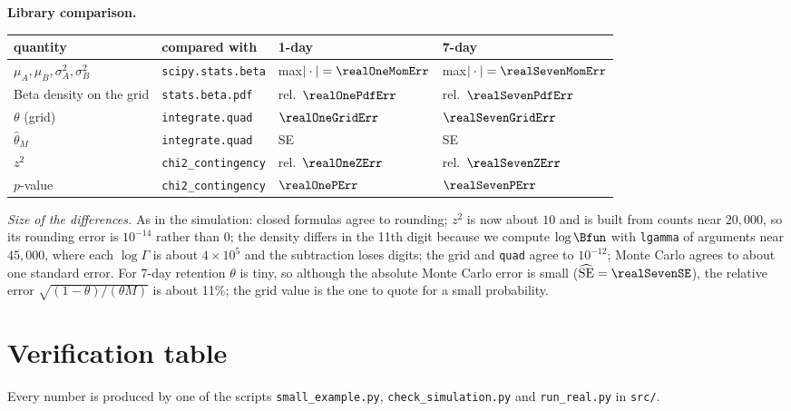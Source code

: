 \textbf{Library comparison.}
\begin{center}\small
\begin{tabular}{llll}\toprule
quantity & compared with & 1-day & 7-day\\ \midrule
$\mu_A,\mu_B,\sigma_A^2,\sigma_B^2$ & \texttt{scipy.stats.beta} & max$|\cdot|=\realOneMomErr$ & max$|\cdot|=\realSevenMomErr$\\
Beta density on the grid & \texttt{stats.beta.pdf} & rel.\ $\realOnePdfErr$ & rel.\ $\realSevenPdfErr$\\
$\theta$ (grid) & \texttt{integrate.quad} & $\realOneGridErr$ & $\realSevenGridErr$\\
$\hat\theta_M$ & \texttt{integrate.quad} & \realOneNSE{} SE & \realSevenNSE{} SE\\
$z^2$ & \texttt{chi2\_contingency} & rel.\ $\realOneZErr$ & rel.\ $\realSevenZErr$\\
$p$-value & \texttt{chi2\_contingency} & $\realOnePErr$ & $\realSevenPErr$\\
\bottomrule\end{tabular}\normalsize
\end{center}
\emph{Size of the differences.} As in the simulation: closed formulas agree to rounding; $z^2$ is now about $10$ and
is built from counts near $20{,}000$, so its rounding error is $10^{-14}$ rather than $0$; the density differs in the
11th digit because we compute $\log\Bfun$ with \texttt{lgamma} of arguments near $45{,}000$, where each
$\log\Gamma$ is about $4\times10^5$ and the subtraction loses digits; the grid and \texttt{quad} agree to $10^{-12}$;
Monte Carlo agrees to about one standard error. For 7-day retention $\theta$ is tiny, so although the absolute
Monte Carlo error is small ($\widehat{\mathrm{SE}}=\realSevenSE$), the relative error
$\sqrt{(1-\theta)/(\theta M)}$ is about 11\%; the grid value is the one to quote for a small probability.

\section{Verification table}\label{sec:verif}

Every number is produced by one of the scripts \texttt{small\_example.py}, \texttt{check\_simulation.py}
and \texttt{run\_real.py} in \texttt{src/}.
\begin{center}\small
{}\normalsize
\end{center}

